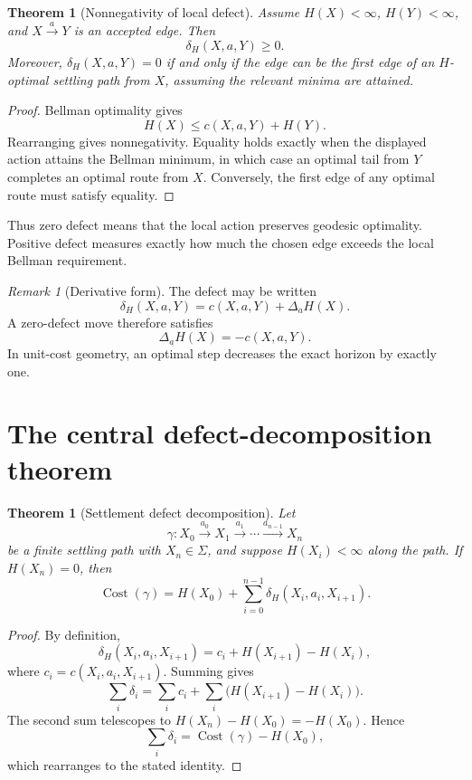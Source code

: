 \documentclass[11pt]{article}
\newtheorem{theorem}[definition]{Theorem}
\theoremstyle{remark}
\newtheorem{remark}[definition]{Remark}
\newcommand{\Cost}{\operatorname{Cost}}
\begin{document}
\begin{theorem}[Nonnegativity of local defect]
Assume $H(X)<\infty$, $H(Y)<\infty$, and $X\xrightarrow{a}Y$ is an accepted edge. Then
\[
\delta_H(X,a,Y)\ge 0.
\]
Moreover, $\delta_H(X,a,Y)=0$ if and only if the edge can be the first edge of an $H$-optimal settling path from $X$, assuming the relevant minima are attained.
\end{theorem}

\begin{proof}
Bellman optimality gives
\[
H(X)\le c(X,a,Y)+H(Y).
\]
Rearranging gives nonnegativity. Equality holds exactly when the displayed action attains the Bellman minimum, in which case an optimal tail from $Y$ completes an optimal route from $X$. Conversely, the first edge of any optimal route must satisfy equality.
\end{proof}

Thus zero defect means that the local action preserves geodesic optimality. Positive defect measures exactly how much the chosen edge exceeds the local Bellman requirement.

\begin{remark}[Derivative form]
The defect may be written
\[
\delta_H(X,a,Y)=c(X,a,Y)+\Delta_aH(X).
\]
A zero-defect move therefore satisfies
\[
\Delta_aH(X)=-c(X,a,Y).
\]
In unit-cost geometry, an optimal step decreases the exact horizon by exactly one.
\end{remark}

\section{The central defect-decomposition theorem}

\begin{theorem}[Settlement defect decomposition]
Let
\[
\gamma:X_0\xrightarrow{a_0}X_1\xrightarrow{a_1}\cdots\xrightarrow{a_{n-1}}X_n
\]
be a finite settling path with $X_n\in\Sigma$, and suppose $H(X_i)<\infty$ along the path. If $H(X_n)=0$, then
\[
\boxed{
\Cost(\gamma)=H(X_0)+\sum_{i=0}^{n-1}\delta_H(X_i,a_i,X_{i+1}).
}
\]
\end{theorem}

\begin{proof}
By definition,
\[
\delta_H(X_i,a_i,X_{i+1})
=c_i+H(X_{i+1})-H(X_i),
\]
where $c_i=c(X_i,a_i,X_{i+1})$. Summing gives
\[
\sum_i\delta_i
=\sum_i c_i+\sum_i\bigl(H(X_{i+1})-H(X_i)\bigr).
\]
The second sum telescopes to $H(X_n)-H(X_0)=-H(X_0)$. Hence
\[
\sum_i\delta_i=\Cost(\gamma)-H(X_0),
\]
which rearranges to the stated identity.
\end{proof}
\end{document}
